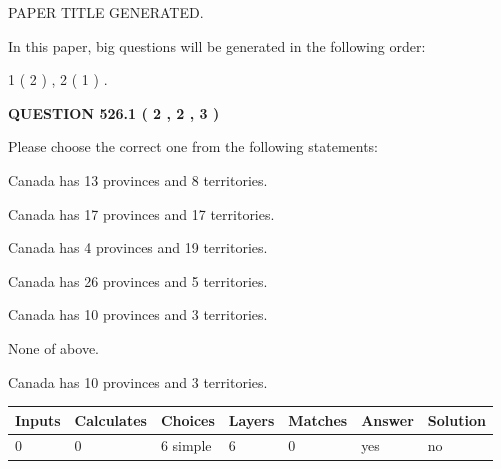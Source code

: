 \documentclass[12pt]{article}
\begin{document}
 
 
 
   
   
 PAPER TITLE GENERATED.
   
   
   
\vspace{0.2in}
   
In this paper, big questions will be generated in the following order: 
   
   
   1 ( 2 )
 ,
   2 ( 1 )
 .
  
\vspace{0.2in}
  
{\textbf{\Large{QUESTION
526.1 
 ( 2 , 2 , 3 )
}}}
  
  
Please choose the correct one from the following statements:
 
 
Canada has  13 provinces and  8 territories.
 
 
Canada has  17 provinces and  17 territories.
 
 
Canada has   4 provinces and  19 territories.
 
 
Canada has  26 provinces and  5 territories.
 
 
Canada has 10  provinces and 3 territories.
 
 
 None of above.
 
 
\noindent{}
 
 
Canada has 10  provinces and 3 territories.
 
 
\noindent{}
 
 
   
   
   
   
\noindent\begin{tabular}{|l|l|l|l|l|l|l|}
 \hline
Inputs & Calculates & Choices & Layers & Matches & Answer & Solution \\ \hline
 0  & 
 0  & 
 6
  simple  
  & 
 6  & 
 0  & 
  yes & 
  no 
  \\ \hline
 \end{tabular}
   
   
   
   
\noindent{}
   
\end{document}
